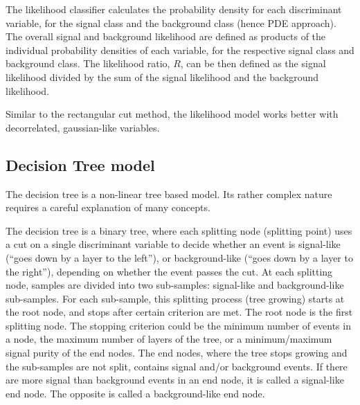 The likelihood classifier calculates the probability density for each discriminant variable, for the signal class and the  background class (hence PDE approach). The overall signal and background likelihood are defined as products of the individual probability densities of each variable, for the respective signal class and background class. The likelihood ratio, $R$, can be then defined as the signal likelihood divided by the sum of the signal likelihood and the background likelihood.



Similar to the rectangular cut method, the likelihood model works better with decorrelated, gaussian-like variables.



\subsection{Decision Tree model}
\label{sec:pandoraDecisionTree}


The decision tree is a non-linear tree based model. Its rather complex nature requires a careful explanation of many concepts.

The decision tree is a binary tree, where each splitting node (splitting point) uses a cut on a single discriminant variable to decide whether an event is signal-like (``goes down by a layer to the left''), or background-like (``goes down by a layer to the right''), depending on whether the event passes the cut. At each splitting node, samples are divided into two sub-samples: signal-like and background-like sub-samples. For each sub-sample, this splitting process (tree growing) starts at the  root node, and stops after certain criterion are met. The root node is the first splitting node. The stopping criterion could be the minimum number of events in a node, the maximum number of layers of the tree, or a minimum/maximum signal purity of the end nodes.  The end nodes, where the tree stops growing and the sub-samples are not split, contains signal and/or background events. If there are more signal than background events in an end node, it is called a signal-like end node. The opposite is called a background-like end node.

